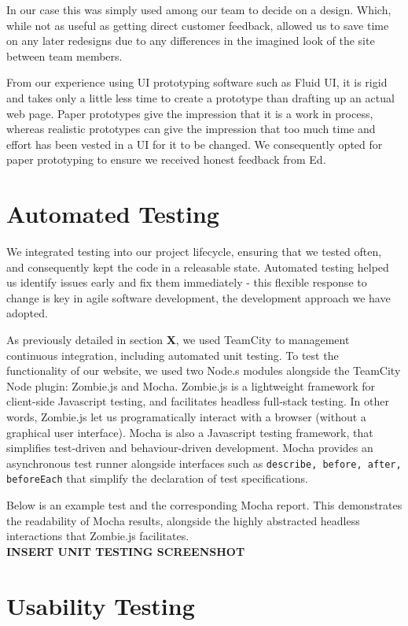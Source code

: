 In our case this was simply used among our team to decide on a design. Which, while not as useful as getting direct customer feedback, allowed us to save time on any later redesigns due to any differences in the imagined look of the site between team members. 

From our experience using UI prototyping software such as Fluid UI, it is rigid and takes only a little less time to create a prototype than drafting up an actual web page. Paper prototypes give the impression that it is a work in process, whereas realistic prototypes can give the impression that too much time and effort has been vested in a UI for it to be changed. We consequently opted for paper prototyping to ensure we received honest feedback from Ed.


\section{Automated Testing}

We integrated testing into our project lifecycle, ensuring that we tested often, and consequently kept the code in a releasable state. Automated testing helped us identify issues early and fix them immediately - this flexible response to change is key in agile software development, the development approach we have adopted. 

As previously detailed in section {\bf X}, we used TeamCity to management continuous integration, including automated unit testing. To test the functionality of our website, we used two Node.s modules alongside the TeamCity Node plugin: Zombie.js and Mocha. Zombie.js is a lightweight framework for client-side Javascript testing, and facilitates headless full-stack testing. In other words, Zombie.js let us programatically interact with a browser (without a graphical user interface). Mocha is also a Javascript testing framework, that simplifies test-driven and behaviour-driven development. Mocha provides an asynchronous test runner alongside interfaces such as {\tt describe, before, after, beforeEach} that simplify the declaration of test specifications.

Below is an example test and the corresponding Mocha report. This demonstrates the readability of Mocha results, alongside the highly abstracted headless interactions that Zombie.js facilitates.  \\

{\bf INSERT UNIT TESTING SCREENSHOT }

\section{Usability Testing}

